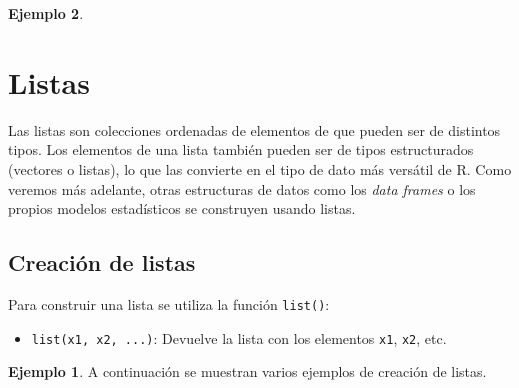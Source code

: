 \documentclass[
]{book}
\providecommand{\tightlist}{%
  \setlength{\itemsep}{0pt}\setlength{\parskip}{0pt}}
\theoremstyle{definition}
\theoremstyle{definition}
\newtheorem{example}{Ejemplo}[chapter]
\theoremstyle{definition}
\theoremstyle{definition}
\theoremstyle{remark}
\begin{document}
\begin{example}
\hypertarget{listas}{%
\section{Listas}\label{listas}}

Las listas son colecciones ordenadas de elementos de que pueden ser de distintos tipos. Los elementos de una lista también pueden ser de tipos estructurados (vectores o listas), lo que las convierte en el tipo de dato más versátil de R. Como veremos más adelante, otras estructuras de datos como los \emph{data frames} o los propios modelos estadísticos se construyen usando listas.

\hypertarget{creaciuxf3n-de-listas}{%
\subsection{Creación de listas}\label{creaciuxf3n-de-listas}}

Para construir una lista se utiliza la función \texttt{list()}:

\begin{itemize}
\tightlist
\item
  \texttt{list(x1,\ x2,\ ...)}: Devuelve la lista con los elementos \texttt{x1}, \texttt{x2}, etc.
\end{itemize}

\begin{example}

A continuación se muestran varios ejemplos de creación de listas.


\end{example}
\end{example}
\end{document}
